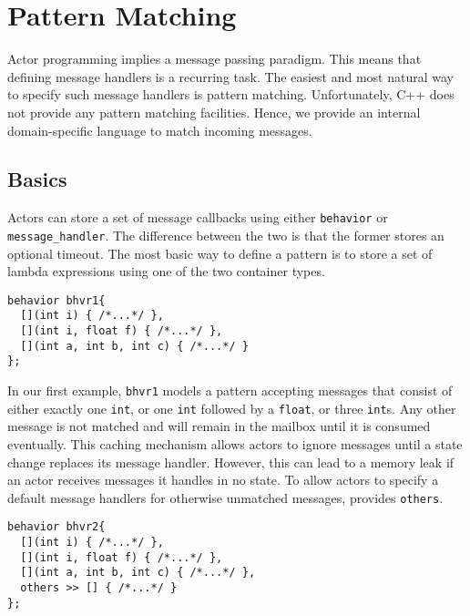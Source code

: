 \section{Pattern Matching}
\label{Sec::PatternMatching}

Actor programming implies a message passing paradigm.
This means that defining message handlers is a recurring task.
The easiest and most natural way to specify such message handlers is pattern matching.
Unfortunately, C++ does not provide any pattern matching facilities.
Hence, we provide an internal domain-specific language to match incoming messages.

\subsection{Basics}
\label{Sec::PatternMatching::Basics}

Actors can store a set of message callbacks using either \lstinline^behavior^ or \lstinline^message_handler^.
The difference between the two is that the former stores an optional timeout.
The most basic way to define a pattern is to store a set of lambda expressions using one of the two container types.

\begin{lstlisting}
behavior bhvr1{
  [](int i) { /*...*/ },
  [](int i, float f) { /*...*/ },
  [](int a, int b, int c) { /*...*/ }
};
\end{lstlisting}

In our first example, \lstinline^bhvr1^ models a pattern accepting messages that consist of either exactly one \lstinline^int^, or one \lstinline^int^ followed by a \lstinline^float^, or three \lstinline^int^s.
Any other message is not matched and will remain in the mailbox until it is consumed eventually.
This caching mechanism allows actors to ignore messages until a state change replaces its message handler.
However, this can lead to a memory leak if an actor receives messages it handles in no state.
To allow actors to specify a default message handlers for otherwise unmatched messages, \lib provides \lstinline^others^.

\begin{lstlisting}
behavior bhvr2{
  [](int i) { /*...*/ },
  [](int i, float f) { /*...*/ },
  [](int a, int b, int c) { /*...*/ },
  others >> [] { /*...*/ }
};
\end{lstlisting}

